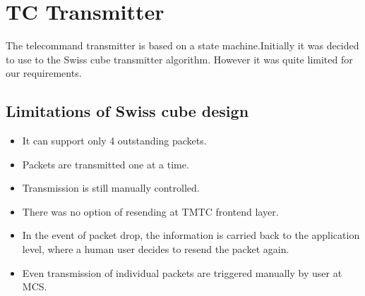 \documentclass[BTech]{iitmdiss}
\begin{document}
\section{TC Transmitter}
The telecommand transmitter is based on a state machine.Initially it was decided to use to the Swiss cube transmitter algorithm. However it was quite limited for our requirements.
\subsection{Limitations of Swiss cube design}
\begin{itemize}
\item It can support only 4 outstanding packets.
\item Packets are transmitted one at a time.
\item Transmission is still manually controlled.
\item There was no option of resending at TMTC frontend layer.
\item In the event of packet drop, the information is carried back to the application level, where a human user decides to resend the packet again.
\item Even transmission of individual packets are triggered manually by user at MCS.

\end{itemize}
\end{document}
